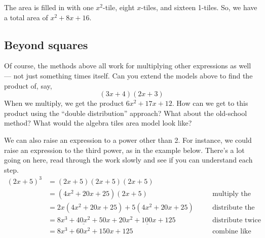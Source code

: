 \begin{center}
\begin{minipage}{0.48\textwidth}
\centering
{}
\end{minipage}
\begin{minipage}{0.48\textwidth}
\centering
{}
\end{minipage}
\end{center}
The area is filled in with one $x^2$-tile, eight $x$-tiles, and sixteen 1-tiles. So, we have a total area of $x^2 + 8x + 16$.

\subsection{Beyond squares}

Of course, the methods above all work for multiplying other expressions as well --- not just something times itself. Can you extend the models above to find the product of, say, \[(3x + 4)(2x + 3)\] When we multiply, we get the product $6x^2 + 17x + 12$. How can we get to this product using the ``double distribution'' approach? What about the old-school method? What would the algebra tiles area model look like?

We can also raise an expression to a power other than 2. For instance, we could raise an expression to the third power, as in the example below. There's a lot going on here, read through the work slowly and see if you can understand each step.
\[\begin{aligned}
(2x+5)^3 &= (2x+5)(2x+5)(2x+5)
\\
&= (4x^2+20x+25)(2x+5)
&&\quad\text{multiply the first two terms}
\\
&= 2x(4x^2+20x+25) + 5(4x^2+20x+25)
&&\quad\text{distribute the three-term expression!}
\\
&= \underline{8x^3 + 40x^2 + 50x} + \underline{20x^2 + 100x + 125}
&&\quad\text{distribute twice more}
\\
&= 8x^3 + 60x^2 + 150x + 125
&&\quad\text{combine like terms}
\end{aligned}\]

